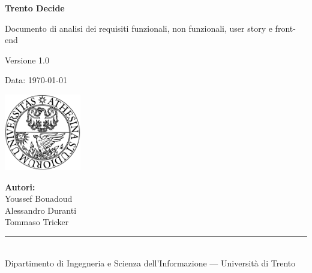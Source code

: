 \documentclass[12pt,a4paper]{report}
\begin{document}
\begin{titlepage}
  \centering

  {\Huge\bfseries Trento Decide \par}
  \vspace{1cm}

  {\Large Documento di analisi dei requisiti funzionali, non funzionali, user story e front-end \par}
  \vspace{1.5cm}

  {\large Versione 1.0 \par}
  \vspace{0.5cm}

  {\large Data: \today \par}
  \vspace{3.5cm}

  \includegraphics[width=0.25\textwidth]{img/unitn.png}

  \vfill

  \begin{flushright}
    \textbf{Autori:}\\[0.3em]
    Youssef Bouadoud\\
    Alessandro Duranti\\
    Tommaso Tricker
  \end{flushright}

  \vspace{1cm}
  \rule{\textwidth}{0.4pt}\\[0.3em]
  {\small Dipartimento di Ingegneria e Scienza dell'Informazione — Università di Trento}
\end{titlepage}

\tableofcontents
\newpage





\end{document}
